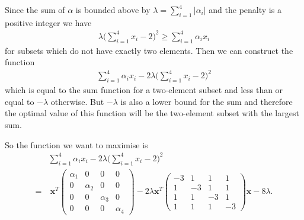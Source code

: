 \documentclass{article}
\begin{document}
Since the sum of \(\alpha\) is bounded above by \(\lambda = \sum_{i=1}^4 |\alpha_i|\) and the penalty is a positive integer we have
\begin{align*}
    \lambda \bigg(\sum_{i=1}^4 x_i - 2\bigg)^2 \geq \sum_{i=1}^4 \alpha_i x_i 
\end{align*}
for subsets which do not have exactly two elements. Then we can construct the function
\begin{align*}
    \sum_{i=1}^4 \alpha_i x_i - 2\lambda \bigg(\sum_{i=1}^4 x_i - 2\bigg)^2
\end{align*}
which is equal to the sum function for a two-element subset and less than or equal to \(-\lambda\) otherwise. But \(-\lambda\) is also a lower bound for the sum and therefore the optimal value of this function will be the two-element subset with the largest sum.

\noindent So the function we want to maximise is
\begin{align*}
    &\sum_{i=1}^4 \alpha_i x_i - 2\lambda \bigg(\sum_{i=1}^4 x_i - 2\bigg)^2 \\ =& \: \mathbf{x}^T\begin{pmatrix}
		\alpha_1 & 0 & 0 & 0 \\
		0 & \alpha_2 & 0 & 0 \\
		0 & 0 & \alpha_3 & 0 \\ 
		0 & 0 & 0 & \alpha_4
	\end{pmatrix} - 2 \lambda \mathbf{x}^T \begin{pmatrix}
	-3 & 1 & 1 & 1 \\
	1 & -3 & 1 & 1 \\
	1 & 1 & -3 & 1 \\
	1 & 1 & 1 & -3
	\end{pmatrix} \mathbf{x} - 8\lambda.
\end{align*}
\end{document}

